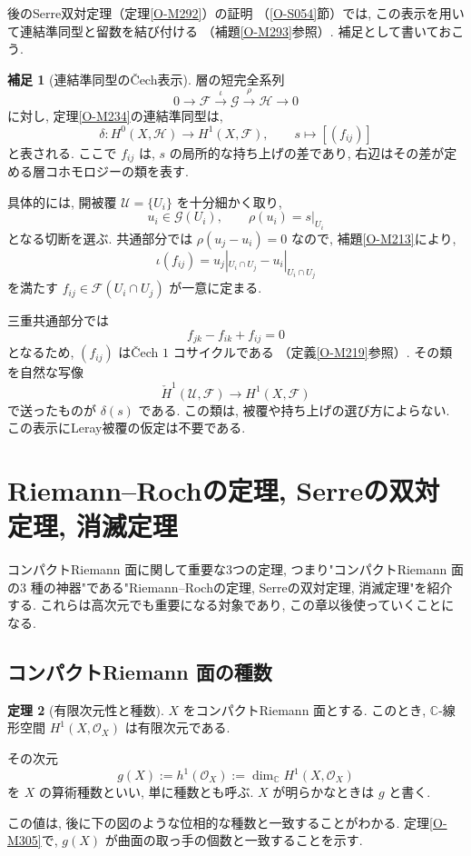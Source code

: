 \documentclass[dvipdfmx,a4paper,11pt]{article} %
\newcommand{\C}{\mathbb{C}}
\theoremstyle{definition}
\newtheorem{thm}{定理}[section]
\numberwithin{equation}{section}
\newtheorem{rem}[thm]{補足}
\begin{document}
後のSerre双対定理（定理\ref{O-M292}）の証明
（\ref{O-S054}節）では,
この表示を用いて連結準同型と留数を結び付ける
（補題\ref{O-M293}参照）. 補足として書いておこう.
\begin{rem}[連結準同型の\v{C}ech表示]
\label{rem-cech-connecting}
層の短完全系列
\[
0\longrightarrow\mathcal F
\xrightarrow{\iota}\mathcal G
\xrightarrow{\rho}\mathcal H
\longrightarrow0
\]
に対し, 定理\ref{O-M234}の連結準同型は,
\[
\delta:H^0(X,\mathcal H)\longrightarrow H^1(X,\mathcal F),
\qquad
s\longmapsto[(f_{ij})]
\]
と表される.
ここで $f_{ij}$ は, $s$ の局所的な持ち上げの差であり,
右辺はその差が定める層コホモロジーの類を表す.

具体的には, 開被覆 $\mathcal U=\{U_i\}$ を十分細かく取り,
\[
u_i\in\mathcal G(U_i),\qquad
\rho(u_i)=s|_{U_i}
\]
となる切断を選ぶ.
共通部分では $\rho(u_j-u_i)=0$ なので,
補題\ref{O-M213}により,
\[
\iota(f_{ij})
=u_j|_{U_i\cap U_j}-u_i|_{U_i\cap U_j}
\]
を満たす $f_{ij}\in\mathcal F(U_i\cap U_j)$ が一意に定まる.

三重共通部分では
\[
f_{jk}-f_{ik}+f_{ij}=0
\]
となるため, $(f_{ij})$ は\v{C}ech $1$ コサイクルである
（定義\ref{O-M219}参照）.
その類を自然な写像
\[
\check H^1(\mathcal U,\mathcal F)
\longrightarrow H^1(X,\mathcal F)
\]
で送ったものが $\delta(s)$ である.
この類は, 被覆や持ち上げの選び方によらない.
この表示にLeray被覆の仮定は不要である.
\end{rem}


\newpage

\section{Riemann--Rochの定理, Serreの双対定理, 消滅定理}\label{O-S043}

コンパクトRiemann 面に関して重要な3つの定理, つまり"コンパクトRiemann 面の$3$ 種の神器"である"Riemann--Rochの定理, Serreの双対定理, 消滅定理"を紹介する. これらは高次元でも重要になる対象であり, この章以後使っていくことになる. 



\subsection{コンパクトRiemann 面の種数}\label{O-S044}


\begin{thm}[有限次元性と種数]\label{O-M242}\label{O-M243}\label{O-M244}
$X$ をコンパクトRiemann 面とする.
このとき, $\C$-線形空間 $H^1(X,\mathcal O_X)$ は有限次元である.

その次元
\[
g(X):=h^1(\mathcal O_X)
:=\dim_{\C}H^1(X,\mathcal O_X)
\]
を $X$ の算術種数といい, 単に種数とも呼ぶ.
$X$ が明らかなときは $g$ と書く.
\end{thm}
この値は, 後に下の図のような位相的な種数と一致することがわかる.
定理\ref{O-M305}で, $g(X)$ が曲面の取っ手の個数と一致することを示す.
\end{document}
